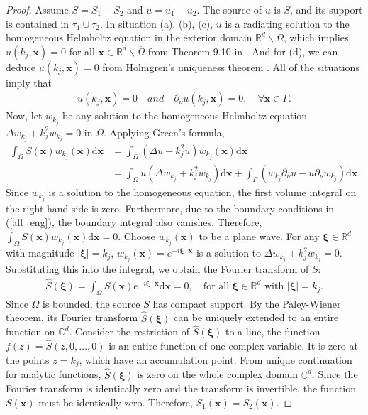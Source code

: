 \documentclass{article}
\theoremstyle{plain}
\theoremstyle{definition}
\begin{document}
{\begin{proof}
Assume $S = S_1 - S_2$ and $u = u_1 - u_2$. The source of $u$ is $S$,  and its support is contained in $\tau_1 \cup \tau_2$. In situation (a),  (b),  (c),   $u$ is a radiating solution to the homogeneous Helmholtz equation in the exterior domain $\mathbb{R}^d \backslash \overline{\Omega}$,  which implies $u(k_j,  \boldsymbol{x}) = 0$ for all $\boldsymbol{x} \in \mathbb{R}^d \backslash \overline{\Omega}$ from Theorem 9.10 in \cite{mclean2000elliptic}. And for (d),  we can deduce $u(k_j,  \boldsymbol{x}) = 0$ from Holmgren's uniqueness theorem \cite{hedenmalm2015Holmgren}. All of the situations imply that 
\begin{align}
\label{all_eng}
u(k_j, \boldsymbol{x})=0 \quad and \quad \partial_{\nu}u(k_j, \boldsymbol{x})=0,  \quad \forall \boldsymbol{x} \in \Gamma.
\end{align}
Now,  let $w_{k_j}$ be any solution to the homogeneous Helmholtz equation $\Delta w_{k_j} + k_j^2 w_{k_j} = 0$ in $\Omega$. Applying Green's formula, 
\begin{align}
\int_{\Omega} S(\boldsymbol{x}) w_{k_j}(\boldsymbol{x}) \mathrm{d}\boldsymbol{x} &= \int_{\Omega} (\Delta u + k_j^2 u) w_{k_j}(\boldsymbol{x}) \mathrm{d}\boldsymbol{x} \\
&= \int_{\Omega} u(\Delta w_{k_j} + k_j^2 w_{k_j}) \mathrm{d}\boldsymbol{x} + \int_{\Gamma} (w_{k_j} \partial_{\nu}u - u \partial_{\nu}w_{k_j}) \mathrm{d}\boldsymbol{x}.
\end{align}
Since $w_{k_j}$ is a solution to the homogeneous equation,  the first volume integral on the right-hand side is zero. Furthermore,  due to the boundary conditions in (\ref{all_eng}),  the boundary integral also vanishes. Therefore, 
$\int_{\Omega} S(\boldsymbol{x}) w_{k_j}(\boldsymbol{x}) \mathrm{d}\boldsymbol{x} = 0.$
Choose $w_{k_j}(\boldsymbol{x})$ to be a plane wave. For any $\boldsymbol{\xi} \in \mathbb{R}^d$ with magnitude $|\boldsymbol{\xi}| = k_j$,  $w_{k_j}(\boldsymbol{x}) = e^{-i\boldsymbol{\xi} \cdot \boldsymbol{x}}$ is a solution to $\Delta w_{k_j} + k_j^2 w_{k_j} = 0$. Substituting this into the integral,  we obtain the Fourier transform of $S$: 
\begin{align}
\hat{S}(\boldsymbol{\xi}) = \int_\Omega S(\boldsymbol{x})e^{-i\boldsymbol{\xi} \cdot \boldsymbol{x}}\mathrm{d}\boldsymbol{x} = 0,  \quad \text{for all } \boldsymbol{\xi} \in \mathbb{R}^d \text{ with } |\boldsymbol{\xi}|=k_j.
\end{align}
Since $\Omega$ is bounded,  the source $S$ has compact support. By the Paley-Wiener theorem,  its Fourier transform $\hat{S}(\boldsymbol{\xi})$ can be uniquely extended to an entire function on $\mathbb{C}^d$.
Consider the restriction of $\hat{S}(\boldsymbol{\xi})$ to a line, the function $f(z) = \hat{S}(z,  0,  \dots,  0)$ is an entire function of one complex variable. It is zero at the points $z = k_j$,  which have an accumulation point. From unique continuation for analytic functions,  $\hat{S}(\boldsymbol{\xi})$ is zero on the whole complex domain $\mathbb{C}^d$. Since the Fourier transform is identically zero and the transform is invertible,  the function $S(\boldsymbol{x})$ must be identically zero. Therefore,  $S_1(\boldsymbol{x}) = S_2(\boldsymbol{x})$.
\end{proof}
}
\end{document}
